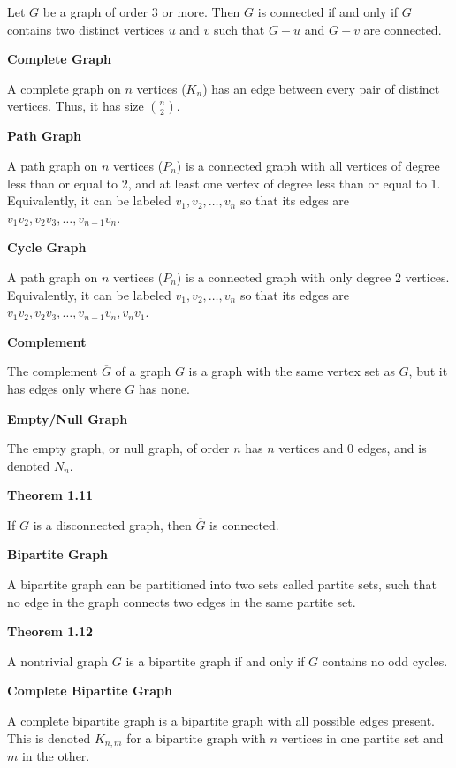 \documentclass{article}
\begin{document}
    Let $G$ be a graph of order 3 or more. Then $G$ is connected if and only if $G$ contains two distinct vertices $u$ and $v$ such that $G - u$ and $G - v$ are connected.

\medskip\noindent\textbf{Complete Graph}

    A complete graph on $n$ vertices ($K_n$) has an edge between every pair of distinct vertices.
    Thus, it has size ${n \choose 2}$.

\medskip\noindent\textbf{Path Graph}

    A path graph on $n$ vertices ($P_n$) is a connected graph with all vertices of degree less than or equal to 2, and at least one vertex of degree less than or equal to 1. Equivalently, it can be labeled $v_1, v_2, \hdots, v_n$ so that its edges are $v_1v_2, v_2v_3, \hdots, v_{n-1}v_n$.

\medskip\noindent\textbf{Cycle Graph}

    A path graph on $n$ vertices ($P_n$) is a connected graph with only degree 2 vertices. Equivalently, it can be labeled $v_1, v_2, \hdots, v_n$ so that its edges are $v_1v_2, v_2v_3, \hdots, v_{n-1}v_n, v_nv_1$.

\medskip\noindent\textbf{Complement}

    The complement $\overline G$ of a graph $G$ is a graph with the same vertex set as $G$, but it has edges only where $G$ has none.

\medskip\noindent\textbf{Empty/Null Graph}

    The empty graph, or null graph, of order $n$ has $n$ vertices and 0 edges, and is denoted $N_n$.

\medskip\noindent\textbf{Theorem 1.11}

    If $G$ is a disconnected graph, then $\overline G$ is connected.

\medskip\noindent\textbf{Bipartite Graph}

    A bipartite graph can be partitioned into two sets called partite sets, such that no edge in the graph connects two edges in the same partite set.

\medskip\noindent\textbf{Theorem 1.12}

    A nontrivial graph $G$ is a bipartite graph if and only if $G$ contains no odd cycles.

\medskip\noindent\textbf{Complete Bipartite Graph}

    A complete bipartite graph is a bipartite graph with all possible edges present. This is denoted $K_{n,m}$ for a bipartite graph with $n$ vertices in one partite set and $m$ in the other.
\end{document}
